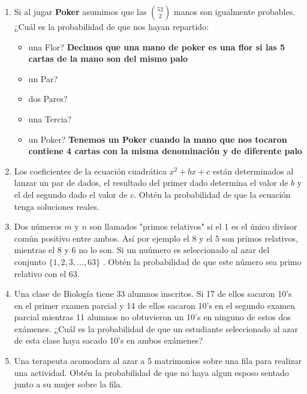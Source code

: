 \documentclass[11pt,letterpaper]{report}
\begin{document}
\begin{enumerate}
\item Si al jugar \textbf{Poker} asumimos que las $\binom{52}{2}$ manos son igualmente probables.
¿Cuál es la probabilidad de que nos hayan repartido:

\begin{itemize}
    \item una Flor? \textbf{Decimos que una mano de poker es una flor si las 5 cartas de la mano son
    del mismo palo} %
    
    
    \item un Par?
    

    \item dos Pares?
    
    \item una Tercia?
    
    \item un Poker? \textbf{Tenemos un Poker cuando la mano que nos tocaron contiene 4 cartas con la
    misma denominación y de diferente palo}
    
\end{itemize}

\item Los coeficientes de la ecuación cuadrática $x^2 + bx + c$ están determinados al lanzar un par
de dados, el resultado del primer dado determina el valor de $b$ y el del segundo dado el valor de
$c$. Obtén la probabilidad de que la ecuación tenga soluciones reales.

\item Dos números $m$ y $n$ son llamados "primos relativos" si el 1 es el único divisor común
positivo entre ambos. Así por ejemplo el 8 y el 5 son primos relativos, mientras el 8 y 6 no lo son.
Si un nuúmero es seleccionado al azar del conjunto $\{ 1, 2, 3,\ldots, 63 \}$ . Obtén la
probabilidad de que este número sea primo relativo con el 63.

\item Una clase de Biología tiene 33 alumnos inscritos. Si 17 de ellos sacaron 10's en el primer
examen parcial y 14 de ellos sacaron 10's en el segundo examen parcial mientras 11 alumnos no
obtuvieron un 10's en ninguno de estos dos exámenes. ¿Cuál es la probabilidad de que un estudiante
seleccionado al azar de esta clase haya sacado 10's en ambos exámenes?

\item Una terapeuta acomodara al azar a 5 matrimonios sobre una fila para realizar una actividad.
Obtén la probabilidad de que no haya algun esposo sentado junto a su mujer sobre la fila.


    
\end{enumerate}





\end{document}

